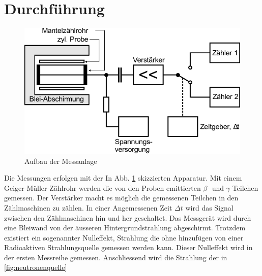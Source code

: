 \section{Durchführung}
\begin{figure}
    \centering
    \includegraphics{Abbildungen/Schaltplan.pdf}
    \caption{Aufbau der Messanlage \cite{man:v702}}
    \label{fig:Aufbau}
\end{figure}
Die Messungen erfolgen mit der In Abb. \ref{fig:Aufbau} skizzierten Apparatur.
Mit einem Geiger-Müller-Zählrohr werden die von den Proben emittierten
$\beta$- und $\gamma$-Teilchen gemessen. 
Der Verstärker macht es möglich die gemessenen Teilchen 
in den Zählmaschinen zu zählen. 
In einer Angemessenen Zeit $\Delta t$ wird das Signal zwischen den
Zählmaschinen hin und her geschaltet.
Das Messgerät wird durch eine Bleiwand von der äusseren 
Hintergrundstrahlung abgeschirmt. 
Trotzdem existiert ein sogenannter Nulleffekt, Strahlung 
die ohne hinzufügen von einer Radioaktiven Strahlungsquelle gemessen werden kann.
Dieser Nulleffekt wird in der ersten Messreihe gemessen. 
Anschliessend wird die Strahlung der in \ref{fig:neutronenquelle}